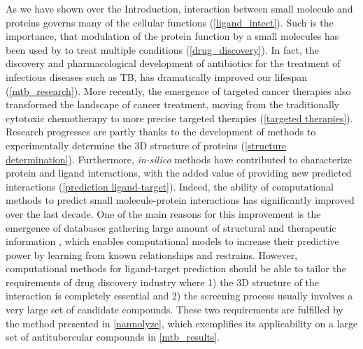 \documentclass[11pt, b5paper,twoside]{tesi_upf}
\begin{document}
\par As we have shown over the Introduction, interaction between small molecule and proteins governs many of the cellular functions (\cref{ligand_intect}). Such is the importance, that modulation of the protein function by a small molecules has been used by to treat multiple conditions (\cref{drug_discovery}). In fact, the discovery and pharmacological development of antibiotics for the treatment of infectious diseases such as TB, has dramatically improved our lifespan (\cref{mtb_research}). More recently, the emergence of targeted cancer therapies also transformed the landscape of cancer treatment, moving from the traditionally cytotoxic chemotherapy to more precise targeted therapies (\cref{targeted therapies}). Research progresses are partly thanks to the development of methods to experimentally determine the 3D structure of proteins (\cref{structure determination}). Furthermore, \textit{in-silico} methods have contributed to characterize protein and ligand interactions, with the added value of providing new predicted interactions (\cref{prediction ligand-target}). Indeed, the ability of computational methods to predict small molecule-protein interactions has significantly improved over the last decade. One of the main reasons for this improvement is the emergence of databases gathering large amount of structural and therapeutic information \cite{Liu2007, Bento2014, Zhu2012}, which enables computational models to increase their predictive power by learning from known relationships and restrains. However, computational methods for ligand-target prediction should be able to tailor the requirements of drug discovery industry where 1) the 3D structure of the interaction is completely essential and 2) the screening process usually involves a very large set of candidate compounds. These two requirements are fulfilled by the method presented in \cref{nannolyze}, which exemplifies its applicability on a large set of antitubercular compounds in \cref{mtb_results}.\\
\end{document}
